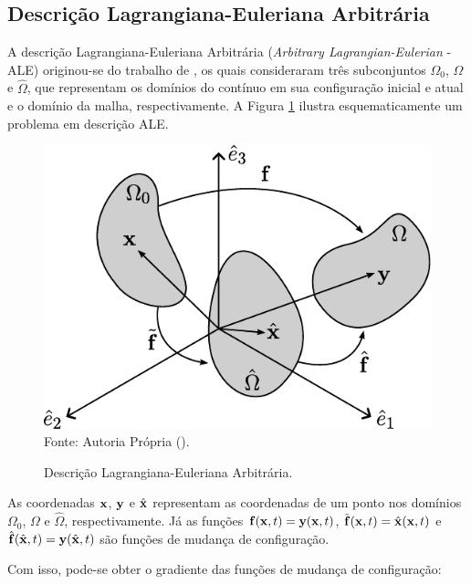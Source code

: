 \documentclass[_ArquivoPrincipal.tex]{subfiles}
\begin{document}
\subsection{Descrição Lagrangiana-Euleriana Arbitrária} \label{CFD-ALE}

A descrição Lagrangiana-Euleriana Arbitrária (\textit{Arbitrary Lagrangian-Eulerian} - ALE) originou-se do trabalho de , os quais consideraram três subconjuntos $\Omega_0$, $\Omega$ e $\hat{\Omega}$, que representam os domínios do contínuo em sua configuração inicial e atual e o domínio da malha, respectivamente. A Figura \ref{Fig:ALE} ilustra esquematicamente um problema em descrição ALE.

\begin{figure}[h]
    \centering
    \caption{Descrição Lagrangiana-Euleriana Arbitrária.}
    \includegraphics[width=.45\linewidth]{Figuras/ALE.pdf}
    \label{Fig:ALE}
    \\Fonte: Autoria Própria (\the\year).
\end{figure}

As coordenadas $\mathbf{x}$, $\mathbf{y}$ e $\hat{\mathbf{x}}$ representam as coordenadas de um ponto nos domínios $\Omega_0$, $\Omega$ e $\hat{\Omega}$, respectivamente. Já as funções $\mathbf{f}(\mathbf{x},t)=\mathbf{y}(\mathbf{x},t)$, $\tilde{\mathbf{f}}(\mathbf{x},t)=\hat{\mathbf{x}}(\mathbf{x},t)$ e $\hat{\mathbf{f}}(\hat{\mathbf{x}},t)=\mathbf{y}(\hat{\mathbf{x}},t)$ são funções de mudança de configuração.

Com isso, pode-se obter o gradiente das funções de mudança de configuração:
\end{document}
